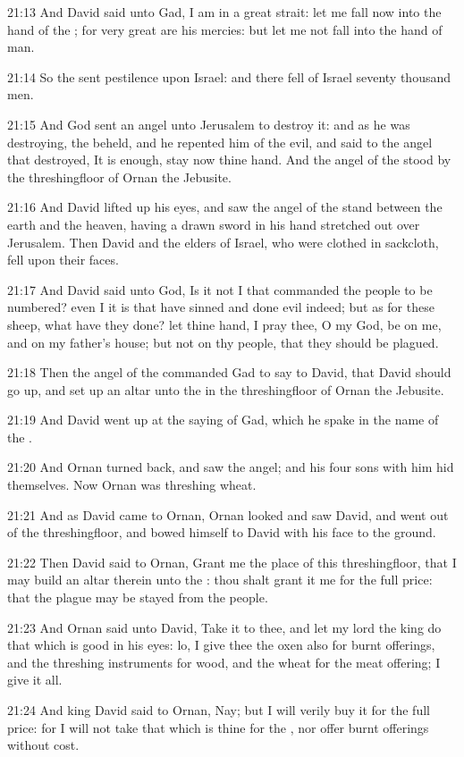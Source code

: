 21:13 And David said unto Gad, I am in a great strait: let me fall now into the hand of the \LORD; for very great are his mercies: but let me not fall into the hand of man.

21:14 So the \LORD sent pestilence upon Israel: and there fell of Israel seventy thousand men.

21:15 And God sent an angel unto Jerusalem to destroy it: and as he was destroying, the \LORD beheld, and he repented him of the evil, and said to the angel that destroyed, It is enough, stay now thine hand.  And the angel of the \LORD stood by the threshingfloor of Ornan the Jebusite.

21:16 And David lifted up his eyes, and saw the angel of the \LORD stand between the earth and the heaven, having a drawn sword in his hand stretched out over Jerusalem. Then David and the elders of Israel, who were clothed in sackcloth, fell upon their faces.

21:17 And David said unto God, Is it not I that commanded the people to be numbered? even I it is that have sinned and done evil indeed; but as for these sheep, what have they done? let thine hand, I pray thee, O \LORD my God, be on me, and on my father's house; but not on thy people, that they should be plagued.

21:18 Then the angel of the \LORD commanded Gad to say to David, that David should go up, and set up an altar unto the \LORD in the threshingfloor of Ornan the Jebusite.

21:19 And David went up at the saying of Gad, which he spake in the name of the \LORD.

21:20 And Ornan turned back, and saw the angel; and his four sons with him hid themselves. Now Ornan was threshing wheat.

21:21 And as David came to Ornan, Ornan looked and saw David, and went out of the threshingfloor, and bowed himself to David with his face to the ground.

21:22 Then David said to Ornan, Grant me the place of this threshingfloor, that I may build an altar therein unto the \LORD: thou shalt grant it me for the full price: that the plague may be stayed from the people.

21:23 And Ornan said unto David, Take it to thee, and let my lord the king do that which is good in his eyes: lo, I give thee the oxen also for burnt offerings, and the threshing instruments for wood, and the wheat for the meat offering; I give it all.

21:24 And king David said to Ornan, Nay; but I will verily buy it for the full price: for I will not take that which is thine for the \LORD, nor offer burnt offerings without cost.


